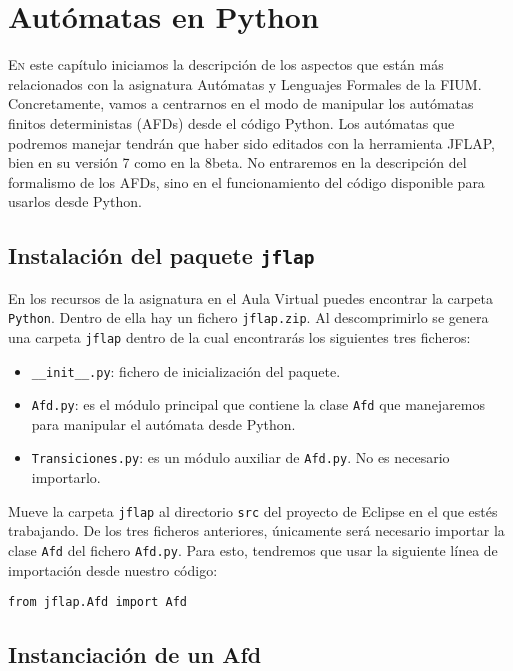 
\chapter{Autómatas en Python}

\lettrine[lines=5]{E}{n} este capítulo iniciamos la descripción de los aspectos que están más relacionados con la asignatura Autómatas y Lenguajes Formales de la FIUM. Concretamente, vamos a centrarnos en el modo de manipular los autómatas finitos deterministas (AFDs) desde el código Python. Los autómatas que podremos manejar tendrán que haber sido editados con la herramienta JFLAP, bien en su versión 7 como en la 8beta. No entraremos en la descripción del formalismo de los AFDs, sino en el funcionamiento del código disponible para usarlos desde Python.

\section{Instalación del paquete \texttt{jflap}}

En los recursos de la asignatura en el Aula Virtual puedes encontrar la carpeta \texttt{Python}. Dentro de ella hay un fichero \texttt{jflap.zip}. Al descomprimirlo se genera una carpeta \texttt{jflap} dentro de la cual encontrarás los siguientes tres ficheros: 

\begin{itemize}
	\item \texttt{\_\_init\_\_.py}: fichero de inicialización del paquete.
	\item \texttt{Afd.py}: es el módulo principal que contiene la clase \texttt{Afd} que manejaremos para manipular el autómata desde Python.
	\item \texttt{Transiciones.py}: es un módulo auxiliar de \texttt{Afd.py}. No es necesario importarlo.
\end{itemize}

Mueve la carpeta \texttt{jflap} al directorio \texttt{src} del proyecto de Eclipse en el que estés trabajando. De los tres ficheros anteriores, únicamente será necesario importar la clase \texttt{Afd} del fichero \texttt{Afd.py}. Para esto, tendremos que usar la siguiente línea de importación desde nuestro código:

\begin{lstlisting}
from jflap.Afd import Afd
\end{lstlisting}

\section{Instanciación de un Afd}


